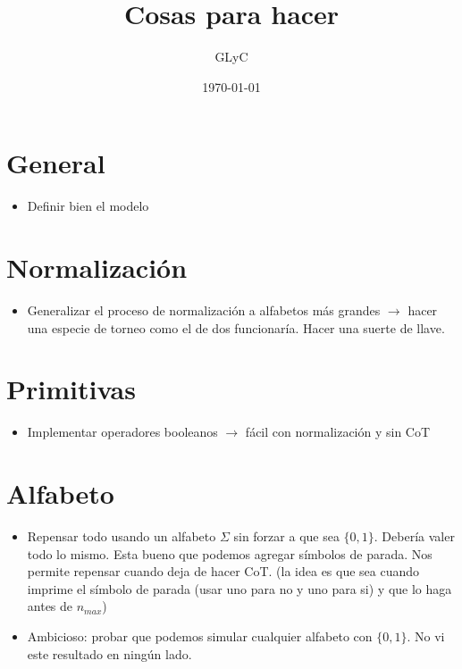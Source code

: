 \documentclass{article}
\title{Cosas para hacer}
\author{GLyC}
\date{\today}
\begin{document}
\maketitle


\section{General}

\begin{itemize}
    \item Definir bien el modelo
\end{itemize}




\section{Normalización}

\begin{itemize}
    \item Generalizar el proceso de normalización a alfabetos más grandes $\rightarrow$ hacer una especie de torneo como el de dos funcionaría. Hacer una suerte de llave.
\end{itemize}




\section{Primitivas}

\begin{itemize}
    \item Implementar operadores booleanos $\rightarrow$ fácil con normalización y sin CoT
\end{itemize}


\section{Alfabeto}

\begin{itemize}
    \item Repensar todo usando un alfabeto $\Sigma$ sin forzar a que sea $\{0,1\}$. Debería valer todo lo mismo. Esta bueno que podemos agregar símbolos de parada. Nos permite repensar cuando deja de hacer CoT. (la idea es que sea cuando imprime el símbolo de parada (usar uno para no y uno para si) y que lo haga antes de $n_{max}$)
    \item Ambicioso: probar que podemos simular cualquier alfabeto con $\{0,1\}$. No vi este resultado en ningún lado.
\end{itemize}
\end{document}
